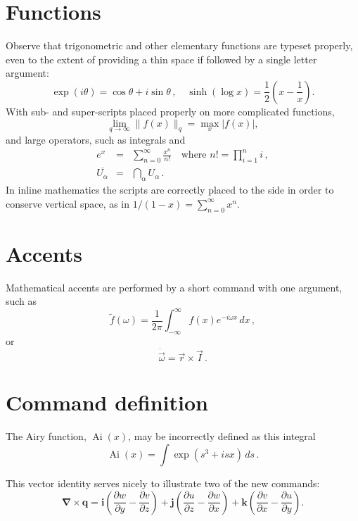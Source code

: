 \documentclass[20pt,a4paper]{extarticle}
\begin{document}
\section{Functions}

Observe that trigonometric and other elementary functions are typeset
properly, even to the extent of providing a thin space if followed by
a single letter argument:
\[
	\exp(i\theta)=\cos\theta +i\sin\theta\,,\quad
	\sinh(\log x)=\frac{1}{2}\left( x-\frac{1}{x} \right).
\]
With sub- and super-scripts placed properly on more complicated
functions,
\[
	\lim_{q\to\infty}\|f(x)\|_q
	=\max_{x}|f(x)|,
\]
and large operators, such as integrals and
\begin{eqnarray*}
	e^x & = & \sum_{n=0}^\infty \frac{x^n}{n!}
	\quad\text{where }n!=\prod_{i=1}^n i\,,  \\
	\overline{U_\alpha} & = & \bigcap_\alpha U_\alpha\,.
\end{eqnarray*}
In inline mathematics the scripts are correctly placed to the side in
order to conserve vertical space, as in
\(
	1/(1-x)=\sum_{n=0}^\infty x^n.
\)






\section{Accents}

Mathematical accents are performed by a short command with one
argument, such as
\[
	\tilde f(\omega)=\frac{1}{2\pi}
	\int_{-\infty}^\infty f(x)e^{-i\omega x}\,dx\,,
\]
or
\[
	\dot{\vec \omega}=\vec r\times\vec I\,.
\]





\section{Command definition}

\newcommand{\Ai}{\operatorname{Ai}}
The Airy function, $\Ai(x)$, may be incorrectly defined as this
integral
\[
	\Ai(x)=\int\exp(s^3+isx)\,ds\,.
\]

\newcommand{\D}[2]{\frac{\partial #2}{\partial #1}}
\newcommand{\DD}[2]{\frac{\partial^2 #2}{\partial #1^2}}
\renewcommand{\vec}[1]{\boldsymbol{#1}}

This vector identity serves nicely to illustrate two of the new
commands:
\[
	\vec\nabla\times\vec q
	=\vec i\left(\D yw-\D zv\right)
	+\vec j\left(\D zu-\D xw\right)
	+\vec k\left(\D xv-\D yu\right).
\]
\end{document}
